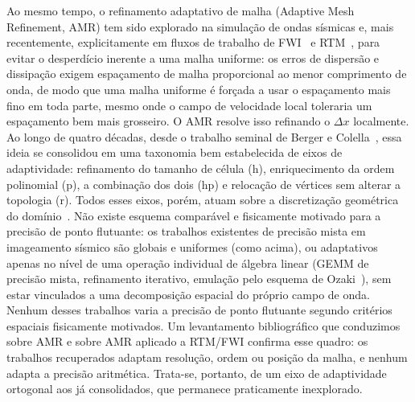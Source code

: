 \documentclass[12pt,a4paper]{article}
\begin{document}
Ao mesmo tempo, o refinamento adaptativo de malha (Adaptive Mesh Refinement,
AMR) tem sido explorado na simulação de ondas sísmicas e, mais recentemente,
explicitamente em fluxos de trabalho de FWI~\cite{thrastarson2020wavefield2,
takekawa2016adaptive} e RTM~\cite{yang2024elasticrtm,lu2024nested,
cho2019frequency,liu2020topography}, para evitar o desperdício inerente a
uma malha uniforme:
os erros de dispersão e dissipação exigem espaçamento de malha proporcional
ao menor comprimento de onda, de modo que uma malha uniforme é forçada a
usar o espaçamento mais fino em toda parte, mesmo onde o campo de velocidade
local toleraria um espaçamento bem mais grosseiro. O AMR resolve isso
refinando o $\Delta x$ localmente. Ao longo de quatro décadas, desde o
trabalho seminal de Berger e Colella~\cite{berger1989amr}, essa ideia se
consolidou em uma taxonomia bem estabelecida de eixos de adaptividade:
refinamento do tamanho de célula (h), enriquecimento da ordem polinomial
(p), a combinação dos dois (hp) e relocação de vértices sem alterar a
topologia (r). Todos esses eixos, porém, atuam sobre a discretização
geométrica do domínio~\cite{vivarelli2025review}. Não existe esquema
comparável e fisicamente motivado para a precisão de ponto flutuante: os
trabalhos existentes de precisão mista em imageamento sísmico são globais e
uniformes (como acima), ou adaptativos apenas no nível de uma operação
individual de álgebra linear (GEMM de precisão mista, refinamento iterativo,
emulação pelo esquema de Ozaki~\cite{ozaki2012errorfree}), sem estar
vinculados a uma decomposição espacial do próprio campo de onda. Nenhum desses trabalhos varia a precisão
de ponto flutuante segundo critérios espaciais fisicamente motivados. Um
levantamento bibliográfico que conduzimos sobre AMR e sobre AMR aplicado a
RTM/FWI confirma esse quadro: os trabalhos recuperados adaptam resolução,
ordem ou posição da malha, e nenhum adapta a precisão aritmética. Trata-se,
portanto, de um eixo de adaptividade ortogonal aos já consolidados, que
permanece praticamente inexplorado.
\end{document}
